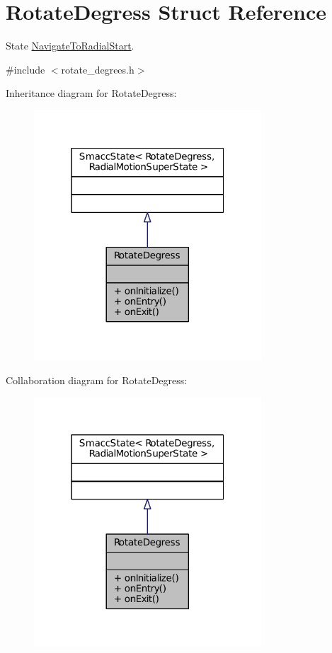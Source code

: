 \hypertarget{structRotateDegress}{}\section{Rotate\+Degress Struct Reference}
\label{structRotateDegress}


State \hyperlink{structNavigateToRadialStart}{Navigate\+To\+Radial\+Start}.  




{\ttfamily \#include $<$rotate\+\_\+degrees.\+h$>$}



Inheritance diagram for Rotate\+Degress\+:
\nopagebreak
\begin{figure}[H]
\begin{center}
\leavevmode
\includegraphics[width=241pt]{structRotateDegress__inherit__graph}
\end{center}
\end{figure}


Collaboration diagram for Rotate\+Degress\+:
\nopagebreak
\begin{figure}[H]
\begin{center}
\leavevmode
\includegraphics[width=241pt]{structRotateDegress__coll__graph}
\end{center}
\end{figure}
